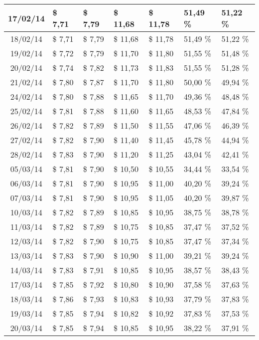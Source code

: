 \begin{center}
\begin{longtable}{|c|p{1.5cm}|p{1.5cm}|p{1.5cm}|p{1.5cm}|p{1.5cm}|p{1.5cm}|}
17/02/14 & \$ 7,71 & \$ 7,79 & \$ 11,68 & \$ 11,78 & 51,49 \% & 51,22 \% \\ \hline
18/02/14 & \$ 7,71 & \$ 7,79 & \$ 11,68 & \$ 11,78 & 51,49 \% & 51,22 \% \\ \hline
19/02/14 & \$ 7,72 & \$ 7,79 & \$ 11,70 & \$ 11,80 & 51,55 \% & 51,48 \% \\ \hline
20/02/14 & \$ 7,74 & \$ 7,82 & \$ 11,73 & \$ 11,83 & 51,55 \% & 51,28 \% \\ \hline
21/02/14 & \$ 7,80 & \$ 7,87 & \$ 11,70 & \$ 11,80 & 50,00 \% & 49,94 \% \\ \hline
24/02/14 & \$ 7,80 & \$ 7,88 & \$ 11,65 & \$ 11,70 & 49,36 \% & 48,48 \% \\ \hline
25/02/14 & \$ 7,81 & \$ 7,88 & \$ 11,60 & \$ 11,65 & 48,53 \% & 47,84 \% \\ \hline
26/02/14 & \$ 7,82 & \$ 7,89 & \$ 11,50 & \$ 11,55 & 47,06 \% & 46,39 \% \\ \hline
27/02/14 & \$ 7,82 & \$ 7,90 & \$ 11,40 & \$ 11,45 & 45,78 \% & 44,94 \% \\ \hline
28/02/14 & \$ 7,83 & \$ 7,90 & \$ 11,20 & \$ 11,25 & 43,04 \% & 42,41 \% \\ \hline
05/03/14 & \$ 7,81 & \$ 7,90 & \$ 10,50 & \$ 10,55 & 34,44 \% & 33,54 \% \\ \hline
06/03/14 & \$ 7,81 & \$ 7,90 & \$ 10,95 & \$ 11,00 & 40,20 \% & 39,24 \% \\ \hline
07/03/14 & \$ 7,81 & \$ 7,90 & \$ 10,95 & \$ 11,05 & 40,20 \% & 39,87 \% \\ \hline
10/03/14 & \$ 7,82 & \$ 7,89 & \$ 10,85 & \$ 10,95 & 38,75 \% & 38,78 \% \\ \hline
11/03/14 & \$ 7,82 & \$ 7,89 & \$ 10,75 & \$ 10,85 & 37,47 \% & 37,52 \% \\ \hline
12/03/14 & \$ 7,82 & \$ 7,90 & \$ 10,75 & \$ 10,85 & 37,47 \% & 37,34 \% \\ \hline
13/03/14 & \$ 7,83 & \$ 7,90 & \$ 10,90 & \$ 11,00 & 39,21 \% & 39,24 \% \\ \hline
14/03/14 & \$ 7,83 & \$ 7,91 & \$ 10,85 & \$ 10,95 & 38,57 \% & 38,43 \% \\ \hline
17/03/14 & \$ 7,85 & \$ 7,92 & \$ 10,80 & \$ 10,90 & 37,58 \% & 37,63 \% \\ \hline
18/03/14 & \$ 7,86 & \$ 7,93 & \$ 10,83 & \$ 10,93 & 37,79 \% & 37,83 \% \\ \hline
19/03/14 & \$ 7,85 & \$ 7,94 & \$ 10,82 & \$ 10,92 & 37,83 \% & 37,53 \% \\ \hline
20/03/14 & \$ 7,85 & \$ 7,94 & \$ 10,85 & \$ 10,95 & 38,22 \% & 37,91 \% \\ \hline

\end{longtable}
\end{center}
